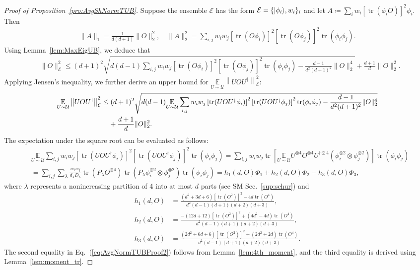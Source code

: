 \documentclass[aps,pra,twocolumn,nofootinbib,superscriptaddress,10pt]{revtex4-2}
\DeclarePairedDelimiter{\ket}{\lvert}{\rangle}
\DeclareMathOperator{\tr}{tr}
\newcommand{\equad}{\,\hphantom{=}\,}   %
\newcommand{\bbE}{\mathbb{E}}
\newcommand{\caE}{\mathcal{E}}
\newcommand{\caU}{\mathcal{U}}
\newcommand{\eref}[1]{Eq.~\textup{(\ref{#1})}}
\newcommand{\lref}[1]{Lemma~\ref{#1}}
\newcommand{\pref}[1]{Proposition~\ref{#1}}
\newcommand{\sref}[1]{Sec.~\ref{#1}}
\begin{document}
\begin{proof}[Proof of \pref{pro:AvgShNormTUB}]
Suppose the ensemble $\caE$ has the form $\caE=\{\ket{\phi_i},w_i\}_i$ and let $A\coloneqq\sum_i w_i\left[\tr\left(\phi_i O\right)\right]^2 \phi_i$. Then
\begin{align}
    \|A\|_1=\frac{1}{d(d+1)}\|O\|_2^2,\quad \|A\|_2^2=\sum_{i,j}w_iw_j\left[\tr(O\phi_{i}) \right]^2\left[\tr(O\phi_{j})\right]^2\tr(\phi_{i}\phi_{j}).
\end{align}
Using \lref{lem:MaxEigUB}, we deduce that
\begin{align}
     &\|O\|_\caE^2\le (d+1)^2\sqrt{d(d-1) \sum_{i,j}w_iw_j\left[\tr(O\phi_{i}) \right]^2\left[\tr(O\phi_{j})\right]^2\tr(\phi_{i}\phi_{j})-\frac{d-1}{d^2(d+1)^2}\|O\|_2^4}+\frac{d+1}{d}\|O\|_2^2.
\end{align}
Applying Jensen's inequality, we further derive an upper bound for $\underset{U\sim\caU}{\bbE}\left\|UOU^{\dagger}\right\|_\caE^2$:
\begin{align}
     \underset{U\sim\caU}{\bbE}\left\|UOU^{\dagger}\right\|_\caE^2&\le (d+1)^2\sqrt{d(d-1)  \underset{U\sim\caU}{\bbE}\sum_{i,j}w_iw_j\left[\tr(UOU^{\dagger}\phi_{i}) \right]^2\left[\tr(UOU^{\dagger}\phi_{j})\right]^2\tr(\phi_{i}\phi_{j})-\frac{d-1}{d^2(d+1)^2}\|O\|_2^4} \nonumber\\
     &\equad+\frac{d+1}{d}\|O\|_2^2. \label{eq:AvgShNormTUBProof1}
\end{align}
The expectation under the square root can be evaluated as follows:
\begin{align}
    &\underset{U\sim\caU}{\bbE} \sum_{i,j}w_iw_j\left[\tr(UOU^{\dagger}\phi_{i}) \right]^2\left[\tr(UOU^{\dagger}\phi_{j})\right]^2\tr(\phi_{i}\phi_{j})= \sum_{i,j}w_iw_j\tr\left[\underset{U\sim\caU}{\bbE}U^{\otimes 4}O^{\otimes 4}U^{\dagger \otimes 4}\left( \phi_i^{\otimes 2}\otimes\phi_j^{\otimes 2}\right)\right]\tr(\phi_{i}\phi_{j})\nonumber\\
    &=\sum_{i,j}\sum_{\lambda}\frac{w_iw_j}{d_\lambda D_\lambda}\tr\left( P_{\lambda} O^{\otimes 4}\right)\tr\left(P_\lambda\phi_i^{\otimes 2}\otimes\phi_j^{\otimes 2}\right)\tr(\phi_{i}\phi_{j})=h_1(d,O)\Phi_1+h_2(d,O)\Phi_2+h_3(d,O)\Phi_3, \label{eq:AvgNormTUBProof2}
\end{align}
where $\lambda$ represents a nonincreasing partition of 4 into at most $d$ parts (see SM \sref{sup:schur}) and
\begin{equation}
    \begin{aligned}
h_1(d,O)&=\frac{(d^2+3d+6)\left[\tr(O^2)\right]^2-4d\tr(O^4)}{d^2(d-1)(d+1)(d+2)(d+3)},\\
h_2(d,O)&=\frac{-(12d+12)\left[\tr(O^2)\right]^2+(4d^2-4d)\tr(O^4)}{d^2(d-1)(d+1)(d+2)(d+3)},\\
h_3(d,O)&=\frac{(2d^2+6d+6)\left[\tr(O^2)\right]^2+(2d^2+2d)\tr(O^4)}{d^2(d-1)(d+1)(d+2)(d+3)}.
\end{aligned}
\end{equation}
The second equality in \eref{eq:AvgNormTUBProof2} follows from \lref{lem:4th_moment}, and the third equality is derived using \lref{lem:moment_tr}. 


\end{proof}
\end{document}
